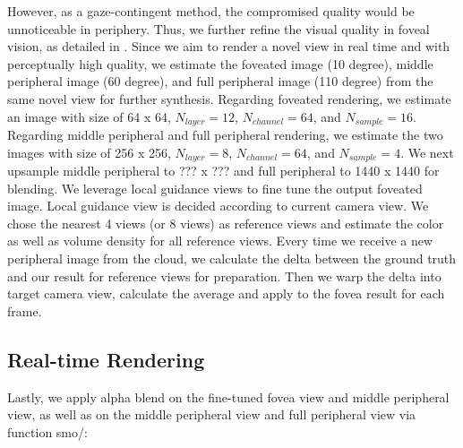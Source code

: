 However, as a gaze-contingent method, the compromised quality would be unnoticeable in periphery. Thus, we further refine the visual quality in foveal vision, as detailed in .
Since we aim to render a novel view in real time and with perceptually high quality, we estimate the foveated image (10 degree), middle peripheral image (60 degree), and full peripheral image (110 degree) from the same novel view for further synthesis. Regarding foveated rendering, we estimate an image with size of 64 x 64, $N_{layer}=12$, $N_{channel}=64$, and $N_{sample}=16$. Regarding middle peripheral and full peripheral rendering, we estimate the two images with size of 256 x 256, $N_{layer}=8$, $N_{channel}=64$, and $N_{sample}=4$. We next upsample middle peripheral to ??? x ??? and full peripheral to 1440 x 1440 for blending.
 We leverage local guidance views to fine tune the output foveated image. Local guidance view is decided according to current camera view. We chose the nearest 4 views (or 8 views) as reference views and estimate the color as well as volume density for all reference views. Every time we receive a new peripheral image from the cloud, we calculate the delta between the ground truth and our result for reference views for preparation. Then we warp the delta into target camera view, calculate the average and apply to the fovea result for each frame.

\subsection{Real-time Rendering}
\label{sec:method:blending}
Lastly, we apply alpha blend on the fine-tuned fovea view and middle peripheral view, as well as on the middle peripheral view and full peripheral view via function smo/:

